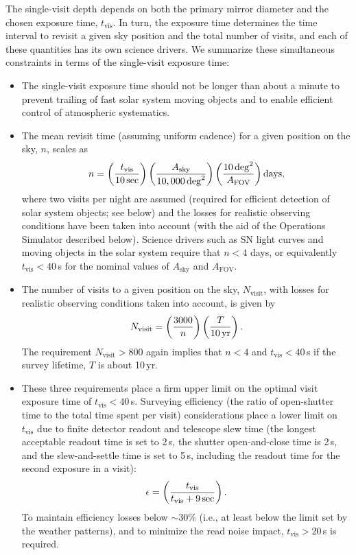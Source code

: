 The single-visit depth depends on both the primary mirror diameter and the
chosen exposure time, $t_\mathrm{vis}$. In turn, the exposure time
determines the time interval to revisit a given sky position and the total
number of visits, and each of these quantities has its own science
drivers. We summarize these simultaneous constraints in terms of the
single-visit exposure time:
\begin{itemize}
\item  The single-visit exposure time should not be longer than about a minute to
         prevent trailing of fast solar system moving objects and to enable efficient
         control of atmospheric systematics.
\item  The mean revisit time (assuming uniform cadence) for a given position
         on the sky, $n$, scales as
\begin{equation}
  \label{eqn:revisit}
  n = \left( {t_\mathrm{vis} \over 10  \, \mathrm{sec}} \right)
      \left( { A_\mathrm{sky} \over 10,000  \, \mathrm{deg}^2} \right)
      \left( {10 \, \mathrm{deg}^2 \over  A_\mathrm{FOV}} \right) \mathrm{days},
\end{equation}
where two visits per night are assumed (required for efficient detection of
solar system objects; see below) and the losses for realistic observing conditions
have been taken into account (with the aid of the Operations Simulator described below).
Science drivers such as SN light curves and moving objects in the solar system require
that $n<4$ days, or equivalently $t_\mathrm{vis} < 40$\,s for the nominal values
of $A_\mathrm{sky} $ and $A_\mathrm{FOV}$.
\item  The number of visits to a given position on the sky, $N_\mathrm{visit}$,
with losses for realistic observing conditions taken into account,
is given by
\begin{equation}
  \label{eqn:nvisits}
      N_\mathrm{visit} = \left( {3000 \over n} \right)
                    \left( { T \over 10 \, \mathrm{yr}} \right).
\end{equation}
The requirement $N_\mathrm{visit}>800$ again implies that $n<4$ and
$t_\mathrm{vis} < 40$\,s if the survey lifetime, $T$ is about 10\,yr.
\item  These three requirements place a firm upper limit on the
optimal visit exposure time of $t_\mathrm{vis} < 40$\,s. Surveying
efficiency (the ratio of open-shutter time to the total
time spent per visit) considerations place a lower limit on
$t_\mathrm{vis}$ due to finite detector readout and telescope slew time (the longest
acceptable readout time is set to 2\,s, the shutter open-and-close
time is 2\,s, and the slew-and-settle time is set to 5\,s, including
the readout time for the second exposure in a visit):
\begin{equation}
  \label{eqn:epsilon}
      \epsilon = \left( {t_\mathrm{vis} \over t_\mathrm{vis} + 9 \, \mathrm{sec}}\right).
\end{equation}
To maintain efficiency losses below $\sim$30\% (i.e., at least below the
limit set by the weather patterns), and to minimize the read noise
impact, $t_\mathrm{vis} > 20$\,s is required.
\end{itemize}

